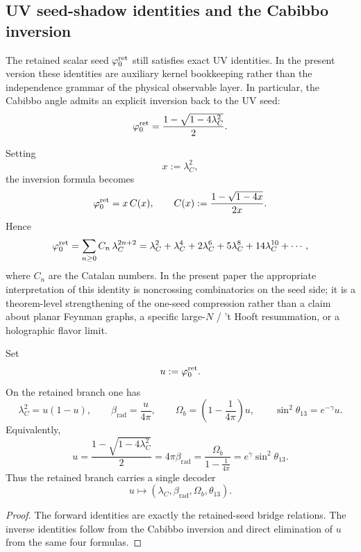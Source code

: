 \subsection{UV seed-shadow identities and the Cabibbo inversion}

The retained scalar seed $\varphi_0^{\mathrm{ret}}$ still satisfies exact UV identities. In the present version these
identities are auxiliary kernel bookkeeping rather than the independence grammar of the physical
observable layer. In particular, the Cabibbo angle admits an explicit inversion back to the UV
seed:
\begin{equation}
\label{eq:cabibbo-inversion}
\varphi_0^{\mathrm{ret}}=\frac{1-\sqrt{1-4\lambda_C^2}}{2}.
\end{equation}
\begin{remark}
Setting
\[
x:=\lambda_C^2,
\]
the inversion formula becomes
\[
\varphi_0^{\mathrm{ret}}=x\,C(x),
\qquad
C(x):=\frac{1-\sqrt{1-4x}}{2x}.
\]
Hence
\begin{equation}
\label{eq:catalan-cabibbo}
\varphi_0^{\mathrm{ret}}
=
\sum_{n\ge 0} C_n\,\lambda_C^{2n+2}
=
\lambda_C^2+\lambda_C^4+2\lambda_C^6+5\lambda_C^8+14\lambda_C^{10}+\cdots,
\end{equation}
where $C_n$ are the Catalan numbers. In the present paper the appropriate interpretation of this
identity is noncrossing combinatorics on the seed side; it is a theorem-level strengthening of
the one-seed compression rather than a claim about planar Feynman graphs, a specific large-$N$ /
't Hooft resummation, or a holographic flavor limit.
\end{remark}

\begin{proposition}
\label{prop:retained-seed-decoder}
Set
\[
u:=\varphi_0^{\mathrm{ret}}.
\]
On the retained branch one has
\[
\lambda_C^2=u(1-u),
\qquad
\beta_{\mathrm{rad}}=\frac{u}{4\pi},
\qquad
\Omega_b=\left(1-\frac{1}{4\pi}\right)u,
\qquad
\sin^2\theta_{13}=e^{-\gamma}u.
\]
Equivalently,
\[
u
=
\frac{1-\sqrt{1-4\lambda_C^2}}{2}
=
4\pi\beta_{\mathrm{rad}}
=
\frac{\Omega_b}{1-\frac{1}{4\pi}}
=
e^\gamma\sin^2\theta_{13}.
\]
Thus the retained branch carries a single decoder
\[
u\longmapsto (\lambda_C,\beta_{\mathrm{rad}},\Omega_b,\theta_{13}).
\]
\end{proposition}

\begin{proof}
The forward identities are exactly the retained-seed bridge relations. The inverse identities follow
from the Cabibbo inversion  and direct elimination of $u$ from the same
four formulas.
\end{proof}


